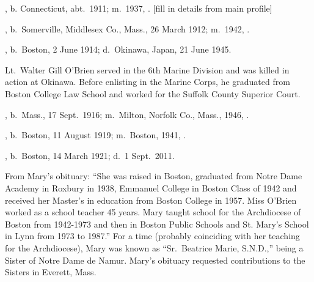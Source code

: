 \begin{Kids}
	, b. Connecticut, abt.\ 1911; m.\ 1937, . [fill in details from main profile]
	
	, b.\ Somerville, Middlesex Co., Mass., 26 March 1912; m.\ 1942, .
	
	, b.\ Boston, 2 June 1914;\cite{Walter4OBrienBirth} d.\ Okinawa, Japan, 21 June 1945.\cite{Walter4OBrienDeath}
	
	\begin{KidsMoreText}
		Lt.\ Walter Gill O'Brien served in the 6th Marine Division and was killed in action at Okinawa.\cite{Walter4OBrienDeath} Before enlisting in the Marine Corps, he graduated from Boston College Law School and worked for the Suffolk County Superior Court.\cite{Walter4OBrienPromotion}
	\end{KidsMoreText}
	
	, b.\ Mass., 17 Sept.\ 1916; m.\ Milton, Norfolk Co., Mass., 1946, .
	
	, b.\ Boston, 11 August 1919; m.\ Boston, 1941, .
	
	, b.\ Boston, 14 March 1921;\cite{Mary4OBrienBirth,Mary4OBrienBirth2} d.\ 1 Sept.\ 2011.\cite{Mary4OBrienBirth,Mary4OBrienDeath}
	
	\begin{KidsMoreText}
		From Mary's obituary: ``She was raised in Boston, graduated from Notre Dame Academy in Roxbury in 1938, Emmanuel College in Boston Class of 1942 and received her Master's in education from Boston College in 1957. Miss O'Brien worked as a school teacher 45 years. Mary taught school for the Archdiocese of Boston from 1942-1973 and then in Boston Public Schools and St. Mary's School in Lynn from 1973 to 1987.''\cite{Mary4OBrienDeath} For a time (probably coinciding with her teaching for the Archdiocese), Mary was known as ``Sr.\ Beatrice Marie, S.N.D.,'' being a Sister of Notre Dame de Namur. \cite{Epilogue,MaryGillDeath} Mary's obituary requested contributions to the Sisters in Everett, Mass.\cite{Mary4OBrienDeath}
	\end{KidsMoreText}
	
\end{Kids}